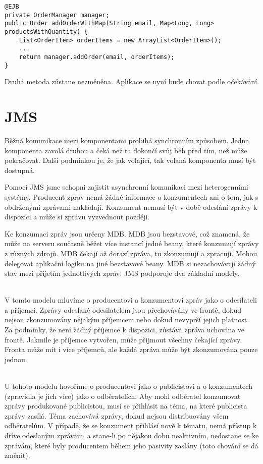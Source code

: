 \documentclass[122pt,oneside]{fithesis}
\begin{document}
\begin{lstlisting}
@EJB
private OrderManager manager;
public Order addOrderWithMap(String email, Map<Long, Long> productsWithQuantity) {
	List<OrderItem> orderItems = new ArrayList<OrderItem>();
	...
	return manager.addOrder(email, orderItems);
}
\end{lstlisting}

Druhá metoda zůstane nezměněna. Aplikace se nyní bude chovat podle očekávání.


\section{JMS}
Běžná komunikace mezi komponentami probíhá synchronním způsobem. Jedna komponenta zavolá druhou a čeká než ta dokončí svůj běh před tím, než může pokračovat. Další podmínkou je, že jak volající, tak volaná komponenta musí být dostupná.

Pomocí JMS jsme schopni zajistit asynchronní komunikaci mezi heterogenními systémy. Producent zpráv nemá žádné informace o konzumentech ani o tom, jak s obdrženými zprávami nakládají. Konzument nemusí být v době odeslání zprávy k dispozici a může si zprávu vyzvednout později.

Ke konzumaci zpráv jsou určeny MDB. MDB jsou bezstavové, což znamená, že může na serveru současně běžet více instancí jedné beany, které konzumují zprávy z různých zdrojů. MDB čekají až dorazí zpráva, tu zkonzumují a zpracují. Mohou delegovat aplikační logiku na jiné bezstavové beany. MDB si nezachovávají žádný stav mezi přijetím jednotlivých zpráv.
JMS podporuje dva základní modely.

\vspace{5 mm}
\\\indent V tomto modelu mluvíme o producentovi a konzumentovi zpráv jako o odesílateli a příjemci. Zprávy odeslané odesilatelem jsou přechovávány ve frontě, dokud nejsou zkonzumovány nějakým příjemcem nebo dokud nevyprší jejich platnost. Za podmínky, že není žádný příjemce k dispozici, zůstává zpráva uchována ve frontě. Jakmile je příjemce vytvořen, může přijmout všechny čekající zprávy. Fronta může mít i více příjemců, ale každá zpráva může být zkonzumována pouze jednou.

\vspace{5 mm}
\\\indent U tohoto modelu hovoříme o producentovi jako o publicistovi a o konzumentech (zpravidla je jich více) jako o odběratelích. Aby mohl odběratel konzumovat zprávy produkované publicistou, musí se přihlásit na téma, na které publicista zprávy zasílá. Téma zachovává zprávy, dokud nejsou distribuovány všem odběratelům. V případě, že se konzument přihlásí nově k tématu, nemá přístup k dříve odeslaným zprávám, a stane-li po nějakou dobu neaktivním, nedostane se ke zprávám, které byly producentem během jeho pasivity zaslány (toto chování se dá změnit).
\end{document}

